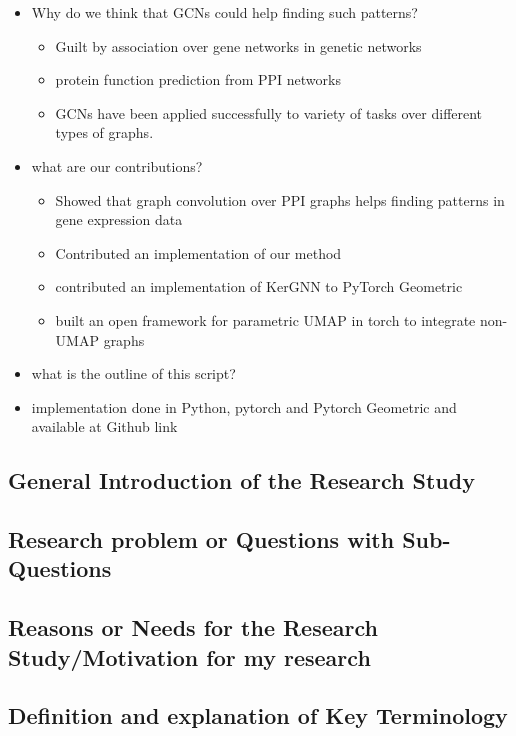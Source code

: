 \documentclass[]{article}
\renewcommand{\cite}{\citep}
\begin{document}
\begin{itemize}
	\item Why do we think that GCNs could help finding such patterns?
	\begin{itemize}
		\item Guilt by association over gene networks \cite{Oliver2000, Gillis2012} in genetic networks
		
		\item protein function prediction from PPI networks \cite{Vazquez2003}
		\item GCNs have been applied successfully to variety of tasks over different types of graphs.		
	\end{itemize}

	\item what are our contributions?
	\begin{itemize}
		\item Showed that graph convolution over PPI graphs helps finding patterns in gene expression data
		\item Contributed an implementation of our method
		\item contributed an implementation of KerGNN to PyTorch Geometric
		\item built an open framework for parametric UMAP in torch to integrate non-UMAP graphs
	\end{itemize}
	\item what is the outline of this script?
	\item implementation done in Python, pytorch and Pytorch Geometric and available at Github link
\end{itemize}

\subsection*{General Introduction of the Research Study}

\subsection*{Research problem or Questions with Sub-Questions}

\subsection*{Reasons or Needs for the Research Study/Motivation for my research}

\subsection*{Definition and explanation of Key Terminology}
\end{document}
